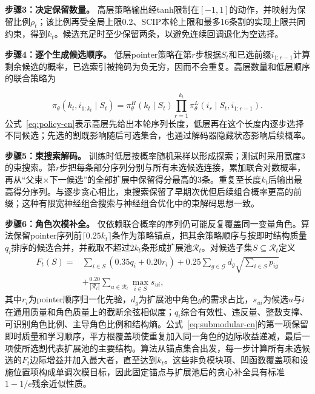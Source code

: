 \documentclass[final,5p,times,twocolumn]{elsarticle}
\begin{document}
\noindent\textbf{步骤3：决定保留数量。} 高层策略输出经tanh限制在$[-1,1]$的动作，并映射为保留比例$\rho_t$；该比例再受全局上限0.2、SCIP本轮上限和最多16条割的实现上限共同约束，得到$k_t$。候选充足时至少保留两条，以避免连续回调退化为空选择。

\noindent\textbf{步骤4：逐个生成候选顺序。} 低层pointer策略在第$r$步根据$S_t$和已选前缀$i_{1:r-1}$计算剩余候选的概率，已选索引被掩码为负无穷，因而不会重复。高层数量和低层顺序的联合策略为

\begin{equation}
\pi_\theta(k_t,i_{1:k_t}\mid S_t)=\pi_\theta^H(k_t\mid S_t)
\prod_{r=1}^{k_t}\pi_\theta^L(i_r\mid S_t,i_{1:r-1}).
\label{eq:policy-cn}
\end{equation}
公式~\eqref{eq:policy-cn}表示高层先给出本轮序列长度，低层再在这个长度内逐步选择不同候选；先选的割既影响随后可选集合，也通过解码器隐藏状态影响后续概率。

\noindent\textbf{步骤5：束搜索解码。} 训练时低层按概率随机采样以形成探索；测试时采用宽度3的束搜索。第$r$步把每条部分序列分别与所有未选候选连接，累加联合对数概率，再从“父束$\times$下一候选”的全部扩展中保留得分最高的3条。重复至长度$k_t$后输出最高得分序列。与逐步贪心相比，束搜索保留了早期次优但后续组合概率更高的前缀；这种有限宽神经组合搜索与神经组合优化中的束解码思想一致\citep{choo2022beam}。

\noindent\textbf{步骤6：角色次模补全。} 仅依赖联合概率的序列仍可能反复覆盖同一变量角色。算法保留pointer序列前$\lceil0.25k_t\rceil$条作为策略锚点，把其余策略顺序与按即时结构质量$q_i$排序的候选合并，并截取不超过$2k_t$条形成扩展池$\mathcal R_t$。对候选子集$S\subseteq\mathcal R_t$定义
\begin{equation}
\begin{aligned}
F_t(S)={}&\sum_{i\in S}(0.35q_i+0.20r_i)
+0.25\sum_{g\in\mathcal G}d_g\sqrt{\sum_{i\in S}p_{ig}}\\
&+\frac{0.20}{|\mathcal R_t|}\sum_{u\in\mathcal R_t}\max_{i\in S}s_{ui},
\end{aligned}
\label{eq:submodular-cn}
\end{equation}
其中$r_i$为pointer顺序归一化先验，$d_g$为扩展池中角色$g$的需求占比，$s_{ui}$为候选$u$与$i$在通用质量和角色质量上的截断余弦相似度；$q_i$综合有效性、违反量、整数支撑、可识别角色比例、主导角色比例和结构熵。公式~\eqref{eq:submodular-cn}的第一项保留即时质量和学习顺序，平方根覆盖项使重复加入同一角色的边际收益递减，最后一项使所选割代表扩展池的主要结构。算法从锚点集合出发，每一步计算所有未选候选的$F_t$边际增益并加入最大者，直至达到$k_t$。这些非负模块项、凹函数覆盖项和设施位置项构成单调次模目标，因此固定锚点与扩展池后的贪心补全具有标准$1-1/e$残余近似性质\citep{nemhauser1978analysis}。
\end{document}
